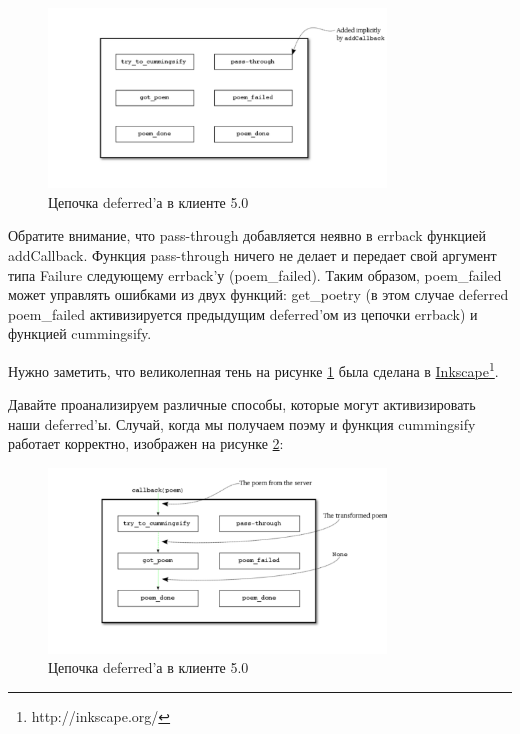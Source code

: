 \begin{figure}[h]
\begin{center}
    \includegraphics[width=0.8\textwidth]{images/deferred-42.pdf}
    \caption{Цепочка deferred'а в клиенте 5.0\label{fig:deferred-42}}
\end{center}
\end{figure}


Обратите внимание, что pass-through добавляется неявно в errback 
функцией addCallback. Функция pass-through ничего не делает и передает 
свой аргумент типа Failure следующему errback'у (poem\_failed). Таким образом, 
poem\_failed может управлять ошибками из двух функций: get\_poetry (в этом 
случае deferred poem\_failed активизируется предыдущим deferred'ом из цепочки 
errback) и функцией cummingsify.


Нужно заметить, что великолепная тень на рисунке \ref{fig:deferred-42} 
была сделана в \href{http://inkscape.org/}{Inkscape}\footnote[1]{http://inkscape.org/}.


Давайте проанализируем различные способы, которые могут активизировать наши deferred'ы.
Случай, когда мы получаем поэму и функция cummingsify работает корректно, изображен 
на рисунке \ref{fig:deferred-5}:

\begin{figure}[h]
\begin{center}
    \includegraphics[width=0.8\textwidth]{images/deferred-5.pdf}
    \caption{Цепочка deferred'а в клиенте 5.0\label{fig:deferred-5}}
\end{center}
\end{figure}

